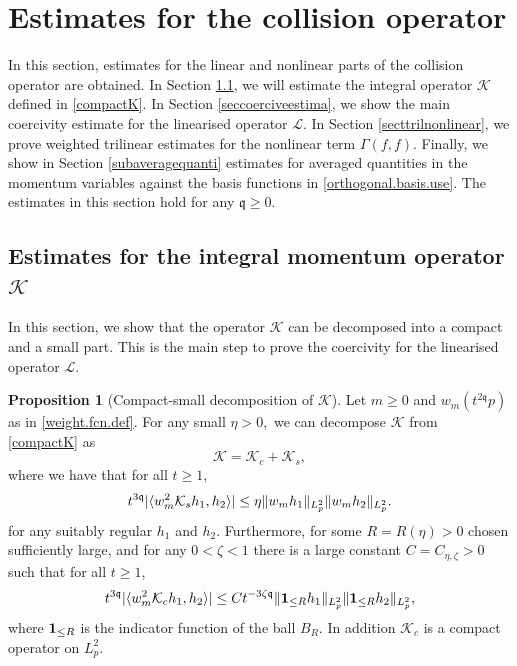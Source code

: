 \documentclass[reqno]{amsart}
\newcommand{\pv}{p}
\newcommand{\qq}{\mathfrak{q}}
\newcommand{\tqq}{t^{2\qq}}
\newcommand{\tTq}{t^{3\qq}}
\newcommand{\compK}{\mathcal{K}}
\newcommand{\linL}{\mathcal{L}}
\newcommand{\ind}{{\bf 1}}
\newcommand{\spr}{\zeta}
\theoremstyle{definition}
\newtheorem{proposition}[theorem]{Proposition}
\numberwithin{equation}{section}
\numberwithin{theorem}{section}
\begin{document}
\section{Estimates for the collision operator}\label{sectcollisionop}


In this section, estimates for the linear and nonlinear parts of the collision operator are obtained. In Section \ref{sectintegralop}, we will estimate the integral operator \(\mathcal{K}\) defined in \eqref{compactK}. In Section \ref{seccoerciveestima}, we show the main coercivity estimate for the linearised operator \(\linL\). In Section \ref{secttrilnonlinear}, we prove weighted trilinear estimates for the nonlinear term \(\Gamma(f,f)\). Finally,  we show in Section \ref{subaveragequanti} estimates for averaged quantities in the momentum variables against the basis functions in \eqref{orthogonal.basis.use}. The estimates in this section hold for any $\qq \ge 0$.  




\subsection{Estimates for the integral momentum operator \(\mathcal{K}\)}\label{sectintegralop}


In this section, we show that the operator \(\mathcal{K}\) can be decomposed into a compact and a small part. This is the main step to prove the coercivity for the linearised operator \(\mathcal{L}\).


\begin{proposition}[Compact-small decomposition of \texorpdfstring{\(\mathcal{K}\)}{}]
\label{noKestimate} 
Let $m\ge 0$ and $w_{m}(\tqq \pv)$ as in \eqref{weight.fcn.def}. For any small $\eta >0,$ we can decompose $\compK$ from \eqref{compactK} as 
$$
\compK = \compK_c + \compK_s,
$$
where we have that for all \(t\geq 1\),
\begin{equation}
 \tTq |\langle  w_{m}^2 \compK_s h_1, h_2\rangle |
\le 
 \eta 
\| w_{m} h_1\|_{L^2_p}
 \| w_{m}  h_2\|_{L^2_p}.
\notag
\end{equation}
for any suitably regular \(h_1\) and \(h_2\). Furthermore, for some $R=R(\eta)>0$ chosen sufficiently large, and for any $0< \spr<1$ there is a large constant $C=C_{\eta,\spr}>0$ such that for all \(t\geq 1\),
\begin{align}\label{compact.improved.est}
    \tTq |\langle w_{m}^2 \compK_c h_1, h_2\rangle |
\le
C t^{-3\spr\qq} \|\ind_{\le R} h_1 \|_{L^2_p} \| \ind_{\le R} h_2 \|_{L^2_p},
\end{align}
where $\ind_{\le R}$ is the indicator function of the ball $B_R$.
In addition $\compK_c$ is a compact operator on $L^2_p$.  
\end{proposition}
\end{document}
